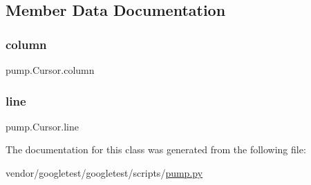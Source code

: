 \subsection{Member Data Documentation}
\mbox{\label{classpump_1_1_cursor_ae73db76c3a845a82afb334633864254e}} 
\subsubsection{\texorpdfstring{column}{column}}
{\footnotesize\ttfamily pump.\+Cursor.\+column}

\mbox{\label{classpump_1_1_cursor_aee8d8b67360da7fc4e635540cb41d48c}} 
\subsubsection{\texorpdfstring{line}{line}}
{\footnotesize\ttfamily pump.\+Cursor.\+line}



The documentation for this class was generated from the following file\+:\begin{DoxyCompactItemize}
\item 
vendor/googletest/googletest/scripts/\hyperlink{pump_8py}{pump.\+py}\end{DoxyCompactItemize}
